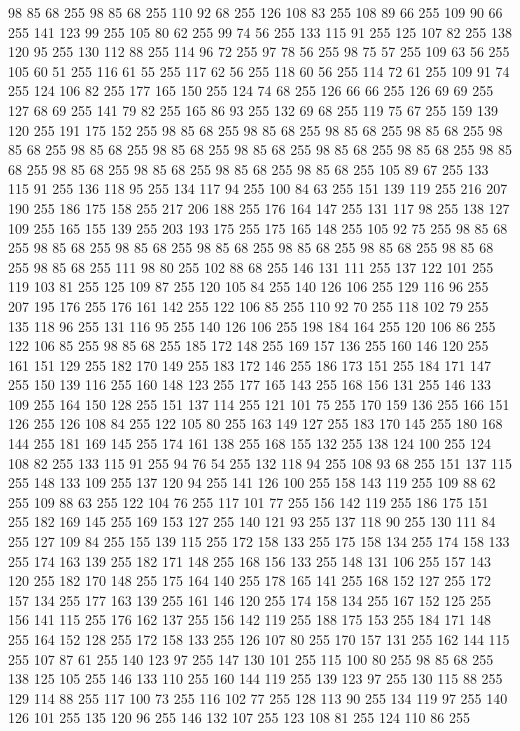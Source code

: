 98 85 68 255 98 85 68 255 110 92 68 255 126 108 83 255 108 89 66 255 109 90 66 255 141 123 99 255 105 80 62 255 99 74 56 255 133 115 91 255 125 107 82 255 138 120 95 255 130 112 88 255 114 96 72 255 97 78 56 255 98 75 57 255 109 63 56 255 105 60 51 255 116 61 55 255 117 62 56 255 118 60 56 255 114 72 61 255 109 91 74 255 124 106 82 255 177 165 150 255 124 74 68 255 126 66 66 255 126 69 69 255 127 68 69 255 141 79 82 255 165 86 93 255 132 69 68 255 119 75 67 255 159 139 120 255 191 175 152 255 98 85 68 255 98 85 68 255 98 85 68 255 98 85 68 255 98 85 68 255 98 85 68 255 98 85 68 255 98 85 68 255 98 85 68 255 98 85 68 255 98 85 68 255 98 85 68 255 98 85 68 255 98 85 68 255 98 85 68 255 105 89 67 255 133 115 91 255 136 118 95 255 134 117 94 255 100 84 63 255 151 139 119 255 216 207 190 255 186 175 158 255 217 206 188 255 176 164 147 255 131 117 98 255 138 127 109 255 165 155 139 255 203 193 175 255
175 165 148 255 105 92 75 255 98 85 68 255 98 85 68 255 98 85 68 255 98 85 68 255 98 85 68 255 98 85 68 255 98 85 68 255 98 85 68 255 111 98 80 255 102 88 68 255 146 131 111 255 137 122 101 255 119 103 81 255 125 109 87 255 120 105 84 255 140 126 106 255 129 116 96 255 207 195 176 255 176 161 142 255 122 106 85 255 110 92 70 255 118 102 79 255 135 118 96 255 131 116 95 255 140 126 106 255 198 184 164 255 120 106 86 255 122 106 85 255 98 85 68 255 185 172 148 255 169 157 136 255 160 146 120 255 161 151 129 255 182 170 149 255 183 172 146 255 186 173 151 255 184 171 147 255 150 139 116 255 160 148 123 255 177 165 143 255 168 156 131 255 146 133 109 255 164 150 128 255 151 137 114 255 121 101 75 255 170 159 136 255 166 151 126 255 126 108 84 255 122 105 80 255 163 149 127 255 183 170 145 255 180 168 144 255 181 169 145 255 174 161 138 255 168 155 132 255 138 124 100 255 124 108 82 255 133 115 91 255 94 76 54 255 132 118 94 255 108 93 68 255 151 137 115 255
148 133 109 255 137 120 94 255 141 126 100 255 158 143 119 255 109 88 62 255 109 88 63 255 122 104 76 255 117 101 77 255 156 142 119 255 186 175 151 255 182 169 145 255 169 153 127 255 140 121 93 255 137 118 90 255 130 111 84 255 127 109 84 255 155 139 115 255 172 158 133 255 175 158 134 255 174 158 133 255 174 163 139 255 182 171 148 255 168 156 133 255 148 131 106 255 157 143 120 255 182 170 148 255 175 164 140 255 178 165 141 255 168 152 127 255 172 157 134 255 177 163 139 255 161 146 120 255 174 158 134 255 167 152 125 255 156 141 115 255 176 162 137 255 156 142 119 255 188 175 153 255 184 171 148 255 164 152 128 255 172 158 133 255 126 107 80 255 170 157 131 255 162 144 115 255 107 87 61 255 140 123 97 255 147 130 101 255 115 100 80 255 98 85 68 255 138 125 105 255 146 133 110 255 160 144 119 255 139 123 97 255 130 115 88 255 129 114 88 255 117 100 73 255 116 102 77 255 128 113 90 255 134 119 97 255 140 126 101 255 135 120 96 255 146 132 107 255 123 108 81 255 124 110 86 255
